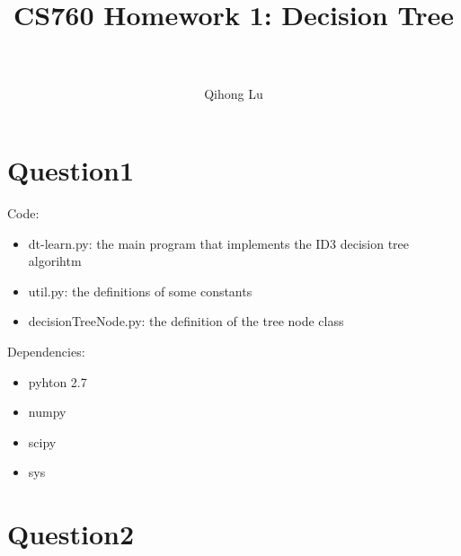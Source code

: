 \documentclass[paper=a4, fontsize=11pt]{scrartcl} %
\title{	
\normalfont \normalsize 
\horrule{0.5pt} \\[0.4cm] %
\huge CS760 Homework 1: Decision Tree\\ %
\horrule{2pt} \\[0.5cm] %
}
\author{Qihong Lu} %
\numberwithin{equation}{section} %
\numberwithin{figure}{section} %
\numberwithin{table}{section} %
\begin{document}
\maketitle %


\section*{Question1}
Code: 
\begin{itemize}
  \item dt-learn.py: the main program that implements the ID3  decision tree algorihtm 
  \item util.py: the definitions of some constants
  \item decisionTreeNode.py: the definition of the tree node class 
\end{itemize}
 
\hfill 

Dependencies: 
\begin{itemize}
  \item pyhton 2.7 
  \item numpy 
  \item scipy 
  \item sys
\end{itemize}


\section*{Question2}
\end{document}

